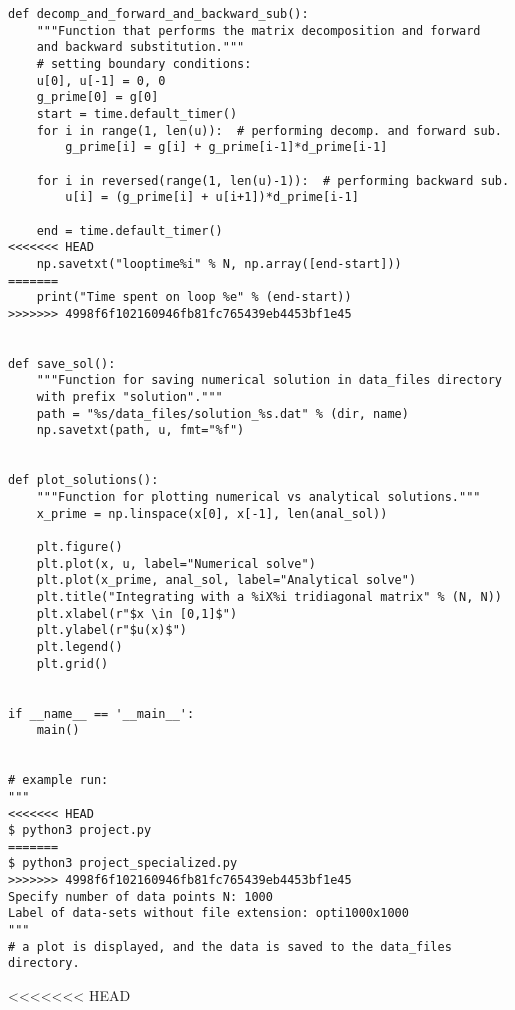 \documentclass[english,notitlepage]{revtex4-1}  %
\begin{document}
\begin{lstlisting}
def decomp_and_forward_and_backward_sub():
    """Function that performs the matrix decomposition and forward
    and backward substitution."""
    # setting boundary conditions:
    u[0], u[-1] = 0, 0
    g_prime[0] = g[0]
    start = time.default_timer()
    for i in range(1, len(u)):  # performing decomp. and forward sub.
        g_prime[i] = g[i] + g_prime[i-1]*d_prime[i-1]

    for i in reversed(range(1, len(u)-1)):  # performing backward sub.
        u[i] = (g_prime[i] + u[i+1])*d_prime[i-1]

    end = time.default_timer()
<<<<<<< HEAD
    np.savetxt("looptime%i" % N, np.array([end-start]))
=======
    print("Time spent on loop %e" % (end-start))
>>>>>>> 4998f6f102160946fb81fc765439eb4453bf1e45


def save_sol():
    """Function for saving numerical solution in data_files directory
    with prefix "solution"."""
    path = "%s/data_files/solution_%s.dat" % (dir, name)
    np.savetxt(path, u, fmt="%f")


def plot_solutions():
    """Function for plotting numerical vs analytical solutions."""
    x_prime = np.linspace(x[0], x[-1], len(anal_sol))

    plt.figure()
    plt.plot(x, u, label="Numerical solve")
    plt.plot(x_prime, anal_sol, label="Analytical solve")
    plt.title("Integrating with a %iX%i tridiagonal matrix" % (N, N))
    plt.xlabel(r"$x \in [0,1]$")
    plt.ylabel(r"$u(x)$")
    plt.legend()
    plt.grid()


if __name__ == '__main__':
    main()


# example run:
"""
<<<<<<< HEAD
$ python3 project.py
=======
$ python3 project_specialized.py
>>>>>>> 4998f6f102160946fb81fc765439eb4453bf1e45
Specify number of data points N: 1000
Label of data-sets without file extension: opti1000x1000
"""
# a plot is displayed, and the data is saved to the data_files directory.

\end{lstlisting}

<<<<<<< HEAD
\end{document}
